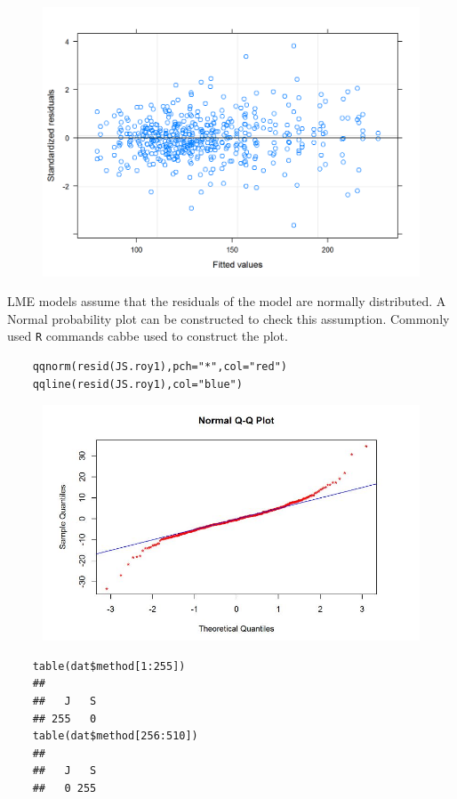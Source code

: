 \documentclass[Main.tex]{subfiles}
\begin{document}
\begin{figure}[h!]
	\centering
	\includegraphics[width=0.9\linewidth]{images/ResidPlot1}
	\caption{}
	\label{fig:ResidPlot1}
\end{figure}
LME models assume that the residuals of the model are normally distributed. A Normal probability plot can be constructed to check this assumption. Commonly used \texttt{R} commands cabbe used to construct the plot.
\newpage

\begin{framed}
	\begin{verbatim}
	qqnorm(resid(JS.roy1),pch="*",col="red")
	qqline(resid(JS.roy1),col="blue")
	\end{verbatim}
\end{framed}




\begin{figure}[h!]
	\centering
	\includegraphics[width=0.7\linewidth]{images/Resid-newplot}
	\caption{}
	\label{fig:Resid-newplot}
\end{figure}

\begin{framed}
	\begin{verbatim}
	table(dat$method[1:255])
	## 
	##   J   S 
	## 255   0
	table(dat$method[256:510])
	## 
	##   J   S 
	##   0 255
	\end{verbatim}	
\end{framed}
\end{document}
